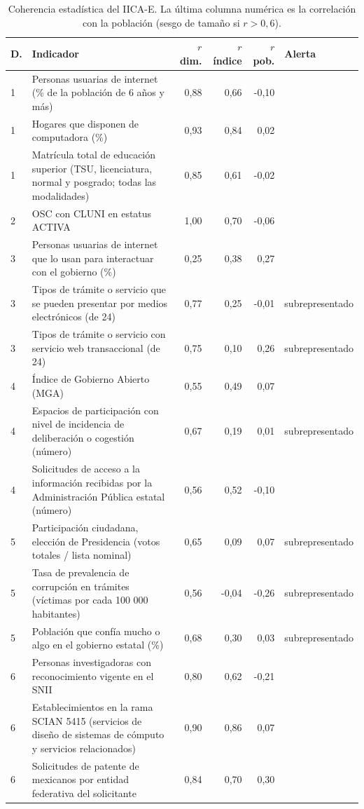 \begin{table}[htbp]\centering\scriptsize
\caption{Coherencia estadística del IICA-E. La última columna numérica es la correlación con la población (sesgo de tamaño si $r>0{,}6$).}\label{tab:coh-est}
\begin{tabular}{@{}p{0.4cm}>{\raggedright\arraybackslash}p{6.0cm}rrr>{\raggedright\arraybackslash}p{2.6cm}@{}}
\toprule
D. & Indicador & $r$ dim. & $r$ índice & $r$ pob. & Alerta\\
\midrule
1 & Personas usuarias de internet (\% de la población de 6 años y más) & 0{,}88 & 0{,}66 & -0{,}10 & \\
1 & Hogares que disponen de computadora (\%) & 0{,}93 & 0{,}84 & 0{,}02 & \\
1 & Matrícula total de educación superior (TSU, licenciatura, normal y posgrado; todas las modalidades) & 0{,}85 & 0{,}61 & -0{,}02 & \\
2 & OSC con CLUNI en estatus ACTIVA & 1{,}00 & 0{,}70 & -0{,}06 & \\
3 & Personas usuarias de internet que lo usan para interactuar con el gobierno (\%) & 0{,}25 & 0{,}38 & 0{,}27 & \\
3 & Tipos de trámite o servicio que se pueden presentar por medios electrónicos (de 24) & 0{,}77 & 0{,}25 & -0{,}01 & subrepresentado\\
3 & Tipos de trámite o servicio con servicio web transaccional (de 24) & 0{,}75 & 0{,}10 & 0{,}26 & subrepresentado\\
4 & Índice de Gobierno Abierto (MGA) & 0{,}55 & 0{,}49 & 0{,}07 & \\
4 & Espacios de participación con nivel de incidencia de deliberación o cogestión (número) & 0{,}67 & 0{,}19 & 0{,}01 & subrepresentado\\
4 & Solicitudes de acceso a la información recibidas por la Administración Pública estatal (número) & 0{,}56 & 0{,}52 & -0{,}10 & \\
5 & Participación ciudadana, elección de Presidencia (votos totales / lista nominal) & 0{,}65 & 0{,}09 & 0{,}07 & subrepresentado\\
5 & Tasa de prevalencia de corrupción en trámites (víctimas por cada 100 000 habitantes) & 0{,}56 & -0{,}04 & -0{,}26 & subrepresentado\\
5 & Población que confía mucho o algo en el gobierno estatal (\%) & 0{,}68 & 0{,}30 & 0{,}03 & subrepresentado\\
6 & Personas investigadoras con reconocimiento vigente en el SNII & 0{,}80 & 0{,}62 & -0{,}21 & \\
6 & Establecimientos en la rama SCIAN 5415 (servicios de diseño de sistemas de cómputo y servicios relacionados) & 0{,}90 & 0{,}86 & 0{,}07 & \\
6 & Solicitudes de patente de mexicanos por entidad federativa del solicitante & 0{,}84 & 0{,}70 & 0{,}30 & \\
\bottomrule
\end{tabular}
\end{table}
